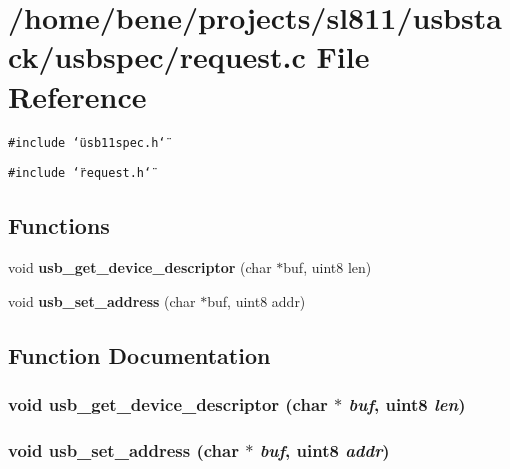 \section{/home/bene/projects/sl811/usbstack/usbspec/request.c File Reference}
\label{request_8c}
{\tt \#include \char`\"{}usb11spec.h\char`\"{}}\par
{\tt \#include \char`\"{}request.h\char`\"{}}\par
\subsection*{Functions}
\begin{CompactItemize}
\item 
void {\bf usb\_\-get\_\-device\_\-descriptor} (char $\ast$buf, uint8 len)
\item 
void {\bf usb\_\-set\_\-address} (char $\ast$buf, uint8 addr)
\end{CompactItemize}


\subsection{Function Documentation}
\subsubsection{\setlength{\rightskip}{0pt plus 5cm}void usb\_\-get\_\-device\_\-descriptor (char $\ast$ {\em buf}, uint8 {\em len})}\label{request_8c_571756ad9a52471ec8f24179d921e445}


\subsubsection{\setlength{\rightskip}{0pt plus 5cm}void usb\_\-set\_\-address (char $\ast$ {\em buf}, uint8 {\em addr})}\label{request_8c_f69d0b47f478e7441601829c6c4d0d17}


